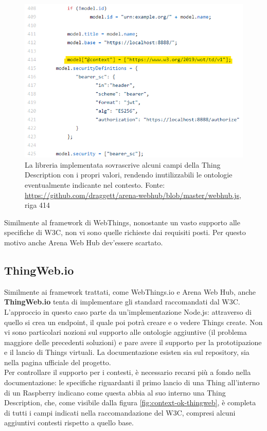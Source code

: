 \documentclass[12pt,a4paper,openright,oneside]{report}
\begin{document}
\begin{figure}[h]
	\centering
	\includegraphics[scale=1]{eps/context_overwritten.png}
	\caption{La libreria implementata sovrascrive alcuni campi della Thing Description con i propri valori, rendendo inutilizzabili le ontologie eventualmente indicante nel contesto. Fonte: \url{https://github.com/draggett/arena-webhub/blob/master/webhub.js}, riga 414}
	\label{fig:context-overwritten}
\end{figure}

Similmente al framework di WebThings, nonostante un vasto supporto alle specifiche di W3C, non vi sono quelle richieste dai requisiti posti. Per questo motivo anche Arena Web Hub dev'essere scartato.


\clearpage
\subsection{ThingWeb.io}
Similmente ai framework trattati, come WebThings.io e Arena Web Hub, anche \textbf{ThingWeb.io} tenta di implementare gli standard raccomandati dal W3C. L'approccio in questo caso parte da un'implementazione Node.js: attraverso di quello si crea un endpoint, il quale poi potrà creare e o vedere Things create. Non vi sono particolari nozioni sul supporto alle ontologie aggiuntive (il problema maggiore delle precedenti soluzioni) e pare avere il supporto per la prototipazione e il lancio di Things virtuali. La documentazione esisten sia sul repository, sia nella pagina ufficiale del progetto.\\

Per controllare il supporto per i contesti, è necessario recarsi più a fondo nella documentazione: le specifiche riguardanti il primo lancio di una Thing all'interno di un Raspberry indicano come questa abbia al suo interno una Thing Description, che, come visibile dalla figura \ref{fig:context-ok-thingweb}, è completa di tutti i campi indicati nella raccomandazione del W3C, compresi alcuni aggiuntivi contesti rispetto a quello base.\\
\end{document}
